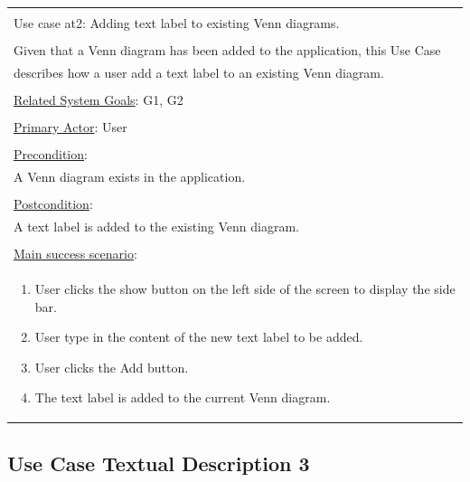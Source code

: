 \documentclass[fontsize=12pt,paper=letter,twoside]{scrartcl}
\begin{document}
\begin{table}[h]
	\begin{tabular}{|l|}
		\hline
		\\
		Use case at2: Adding text label to existing Venn diagrams.							\\
		\\
		Given that a Venn diagram has been added to the application, this Use Case		\\
		describes how a user add a text label to an existing Venn diagram.					\\
		\\
		\underline{Related System Goals}: G1, G2												\\
		\\
		\underline{Primary Actor}: User														\\
		\\
		\underline{Precondition}:															\\ \qquad
		A Venn diagram exists in the application.								\\
		\\
		\underline{Postcondition}:															\\ \qquad
		A text label is added to the existing Venn diagram.									\\
		\\
		\underline{Main success scenario}:													\\
		\begin{minipage}{6in}
			\vskip 4pt
			\begin{enumerate}
				\item User clicks the show button on the left side of the screen to display the side bar.
				\item User type in the content of the new text label to be added.
				\item User clicks the Add button.
				\item The text label is added to the current Venn diagram.
			\end{enumerate}
			\vskip 4pt
		\end{minipage}
		\\
		\hline
	\end{tabular}
\end{table}

\newpage

\subsection*{Use Case Textual Description 3}
\end{document}
